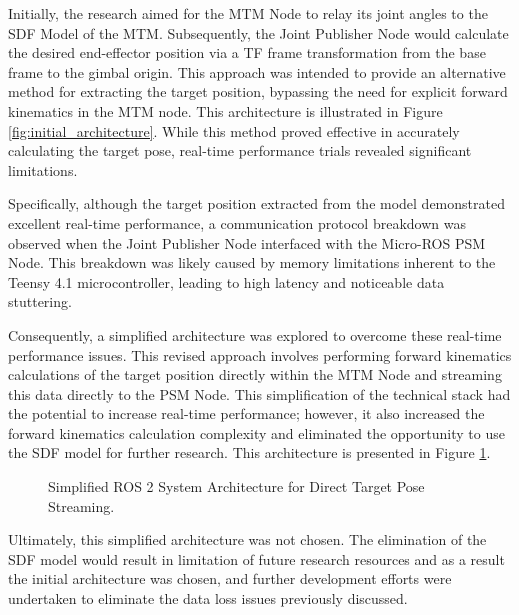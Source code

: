 Initially, the research aimed for the MTM Node to relay its joint angles to the SDF Model of the MTM. Subsequently, the Joint Publisher Node would calculate the desired end-effector position via a TF frame transformation from the base frame to the gimbal origin. This approach was intended to provide an alternative method for extracting the target position, bypassing the need for explicit forward kinematics in the MTM node. This architecture is illustrated in Figure \ref{fig:initial_architecture}. While this method proved effective in accurately calculating the target pose, real-time performance trials revealed significant limitations.

Specifically, although the target position extracted from the model demonstrated excellent real-time performance, a communication protocol breakdown was observed when the Joint Publisher Node interfaced with the Micro-ROS PSM Node. This breakdown was likely caused by memory limitations inherent to the Teensy 4.1 microcontroller, leading to high latency and noticeable data stuttering.

Consequently, a simplified architecture was explored to overcome these real-time performance issues. This revised approach involves performing forward kinematics calculations of the target position directly within the MTM Node and streaming this data directly to the PSM Node. This simplification of the technical stack had the potential to increase real-time performance; however, it also increased the forward kinematics calculation complexity and eliminated the opportunity to use the SDF model for further research. This architecture is presented in Figure \ref{fig:optimized_architecture}.

\begin{figure}[h!]
    \centering
    \caption{Simplified ROS 2 System Architecture for Direct Target Pose Streaming.}
    \label{fig:optimized_architecture}
\end{figure}

Ultimately, this simplified architecture was not chosen. The elimination of the SDF model would result in limitation of future research resources and as a result the initial architecture was chosen, and further development efforts were undertaken to eliminate the data loss issues previously discussed.

